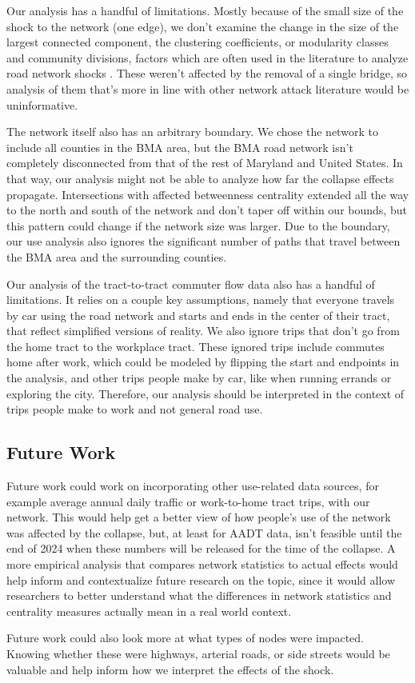 \documentclass[11pt]{article}
\numberwithin{equation}{section} %
\numberwithin{figure}{section} %
\numberwithin{table}{section} %
\theoremstyle{definition}
\begin{document}
Our analysis has a handful of limitations. Mostly because of the small size of the shock to the network (one edge), we don't examine the change in the size of the largest connected component, the clustering coefficients, or modularity classes and community divisions, factors which are often used in the literature to analyze road network shocks \parencites{Xeumei10}. These weren't affected by the removal of a single bridge, so analysis of them that's more in line with other network attack literature would be uninformative.

The network itself also has an arbitrary boundary. We chose the network to include all counties in the BMA area, but the BMA road network isn't completely disconnected from that of the rest of Maryland and United States. In that way, our analysis might not be able to analyze how far the collapse effects propagate. Intersections with affected betweenness centrality extended all the way to the north and south of the network and don't taper off within our bounds, but this pattern could change if the network size was larger. Due to the boundary, our use analysis also ignores the significant number of paths that travel between the BMA area and the surrounding counties.

Our analysis of the tract-to-tract commuter flow data also has a handful of limitations. It relies on a couple key assumptions, namely that everyone travels by car using the road network and starts and ends in the center of their tract, that reflect simplified versions of reality. We also ignore trips that don't go from the home tract to the workplace tract. These ignored trips include commutes home after work, which could be modeled by flipping the start and endpoints in the analysis, and other trips people make by car, like when running errands or exploring the city. Therefore, our analysis should be interpreted in the context of trips people make to work and not general road use.


\subsection{Future Work}

Future work could work on incorporating other use-related data sources, for example average annual daily traffic or work-to-home tract trips, with our network. This would help get a better view of how people's use of the network was affected by the collapse, but, at least for AADT data, isn't feasible until the end of 2024 when these numbers will be released for the time of the collapse. A more empirical analysis that compares network statistics to actual effects would help inform and contextualize future research on the topic, since it would allow researchers to better understand what the differences in network statistics and centrality measures actually mean in a real world context.

Future work could also look more at what types of nodes were impacted. Knowing whether these were highways, arterial roads, or side streets would be valuable and help inform how we interpret the effects of the shock.

\clearpage
\printbibliography
\end{document}
